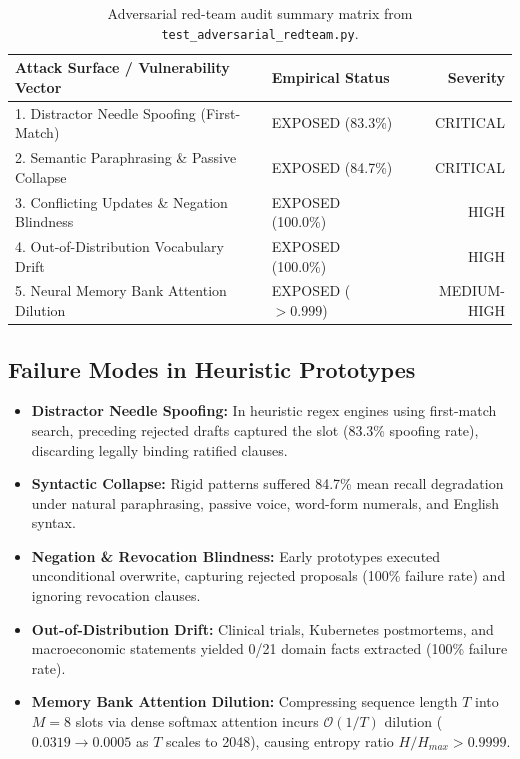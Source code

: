 \documentclass[11pt,a4paper]{article}
\begin{document}
\begin{table}[h]
\centering
\small
\renewcommand{\arraystretch}{1.15}
\begin{tabular}{llr}
\toprule
\textbf{Attack Surface / Vulnerability Vector} & \textbf{Empirical Status} & \textbf{Severity} \\
\midrule
1. Distractor Needle Spoofing (First-Match)  & EXPOSED (83.3\%)  & CRITICAL \\
2. Semantic Paraphrasing \& Passive Collapse & EXPOSED (84.7\%)  & CRITICAL \\
3. Conflicting Updates \& Negation Blindness & EXPOSED (100.0\%) & HIGH \\
4. Out-of-Distribution Vocabulary Drift      & EXPOSED (100.0\%) & HIGH \\
5. Neural Memory Bank Attention Dilution     & EXPOSED ($>0.999$) & MEDIUM-HIGH \\
\bottomrule
\end{tabular}
\caption{Adversarial red-team audit summary matrix from \texttt{test\_adversarial\_redteam.py}.}
\label{tab:redteam}
\end{table}

\subsection{Failure Modes in Heuristic Prototypes}
\begin{itemize}[leftmargin=*]
    \item \textbf{Distractor Needle Spoofing:} In heuristic regex engines using first-match search, preceding rejected drafts captured the slot (83.3\% spoofing rate), discarding legally binding ratified clauses.
    \item \textbf{Syntactic Collapse:} Rigid patterns suffered 84.7\% mean recall degradation under natural paraphrasing, passive voice, word-form numerals, and English syntax.
    \item \textbf{Negation \& Revocation Blindness:} Early prototypes executed unconditional overwrite, capturing rejected proposals (100\% failure rate) and ignoring revocation clauses.
    \item \textbf{Out-of-Distribution Drift:} Clinical trials, Kubernetes postmortems, and macroeconomic statements yielded 0/21 domain facts extracted (100\% failure rate).
    \item \textbf{Memory Bank Attention Dilution:} Compressing sequence length $T$ into $M=8$ slots via dense softmax attention incurs $\mathcal{O}(1/T)$ dilution ($0.0319 \to 0.0005$ as $T$ scales to 2048), causing entropy ratio $H/H_{max} > 0.9999$.
\end{itemize}
\end{document}
